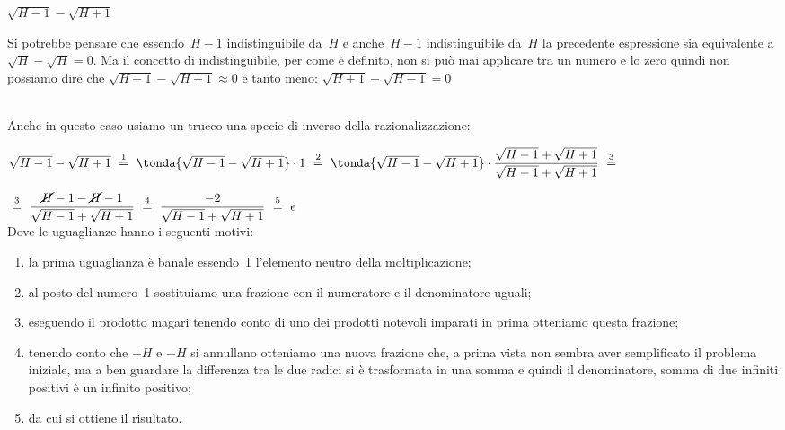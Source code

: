 \begin{esempio}
\(\sqrt{H -1} - \sqrt{H +1}\)

\begin{osservazione}
 Si potrebbe pensare che essendo~\(H -1\) indistinguibile da~\(H\) e 
anche~\(H -1\) indistinguibile da~\(H\) la precedente espressione sia 
equivalente a \(\sqrt{H} - \sqrt{H} = 0\).
Ma il concetto di indistinguibile, per come è definito, 
non si può mai applicare tra un numero e lo zero quindi non possiamo dire che 
\(\sqrt{H -1} - \sqrt{H +1} \approx 0\) e 
tanto meno: \(\sqrt{H +1} - \sqrt{H -1} = 0\)
\end{osservazione}\\

Anche in questo caso usiamo un trucco una specie di inverso della 
razionalizzazione:

\(\sqrt{H -1} - \sqrt{H +1}
~ \stackrel{1}{=} ~
   \tonda{\sqrt{H -1} - \sqrt{H +1}} \cdot 1 
~ \stackrel{2}{=} ~
   \tonda{\sqrt{H -1} - \sqrt{H +1}} \cdot 
   \dfrac{\sqrt{H -1} + \sqrt{H +1}}{\sqrt{H -1} + \sqrt{H +1}}
~ \stackrel{3}{=} ~\)

\(~ \stackrel{3}{=} ~
   \dfrac{\cancel{H} -1 - \cancel{H} -1}{\sqrt{H -1} + \sqrt{H +1}}
~ \stackrel{4}{=} ~
   \dfrac{-2}{\sqrt{H -1} + \sqrt{H +1}}
~ \stackrel{5}{=} ~
  \epsilon\)\\

Dove le uguaglianze hanno i seguenti motivi:
\begin{enumerate} [nosep]
 \item la prima uguaglianza è banale essendo~1 l'elemento neutro della
moltiplicazione; 
 \item al posto del numero~1 sostituiamo una frazione con il numeratore e il 
denominatore uguali; 
 \item eseguendo il prodotto magari tenendo conto di uno dei prodotti notevoli 
imparati in prima otteniamo questa frazione;
 \item tenendo conto che \(+H\) e \(-H\) si annullano otteniamo una nuova 
frazione che, a prima vista non sembra aver semplificato il problema iniziale, 
ma a ben guardare la differenza tra le due radici si è trasformata in una somma 
e quindi il denominatore, somma di due infiniti positivi è un infinito positivo;
 \item da cui si ottiene il risultato.
\end{enumerate}
\end{esempio}



